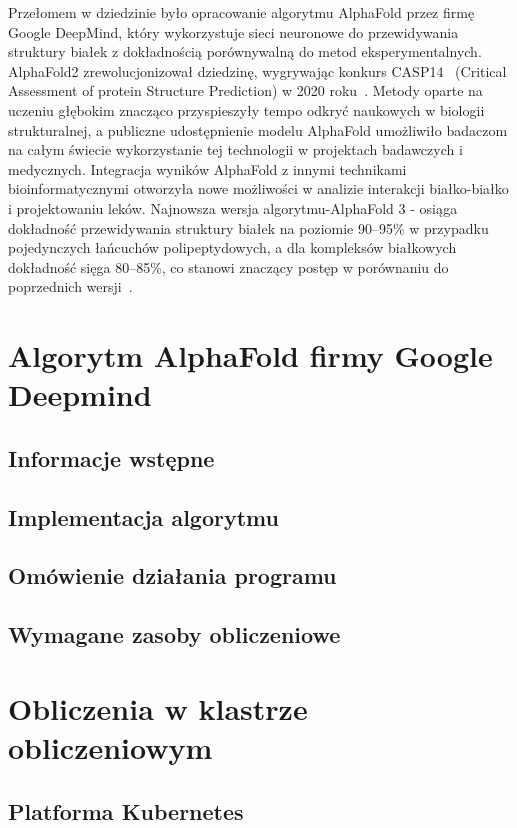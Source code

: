 Przełomem w dziedzinie było opracowanie algorytmu AlphaFold przez firmę Google DeepMind, który wykorzystuje sieci neuronowe do przewidywania struktury białek z dokładnością porównywalną do metod eksperymentalnych.
AlphaFold2 zrewolucjonizował dziedzinę, wygrywając konkurs CASP14~\cite{casp} (Critical Assessment of protein Structure Prediction) w 2020 roku~\cite{alphafold2}.
Metody oparte na uczeniu głębokim znacząco przyspieszyły tempo odkryć naukowych w biologii strukturalnej, a publiczne udostępnienie modelu AlphaFold umożliwiło badaczom na całym świecie wykorzystanie tej technologii w projektach badawczych i medycznych.
Integracja wyników AlphaFold z innymi technikami bioinformatycznymi otworzyła nowe możliwości w analizie interakcji białko-białko i projektowaniu leków.
Najnowsza wersja algorytmu-AlphaFold 3 - osiąga dokładność przewidywania struktury białek na poziomie 90--95\% w przypadku pojedynczych łańcuchów polipeptydowych, a dla kompleksów białkowych dokładność sięga 80--85\%, co stanowi znaczący postęp w porównaniu do poprzednich wersji~\cite{alphafold3}.

\section{Algorytm AlphaFold firmy Google Deepmind}

\subsection{Informacje wstępne}

\subsection{Implementacja algorytmu}

\subsection{Omówienie działania programu}

\subsection{Wymagane zasoby obliczeniowe}


\section{Obliczenia w klastrze obliczeniowym}

\subsection{Platforma Kubernetes}

